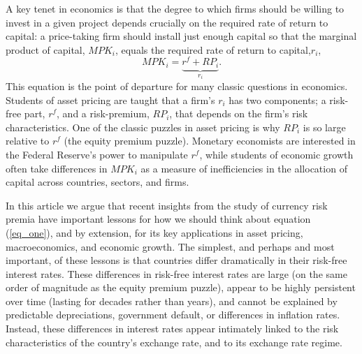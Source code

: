 \documentclass[12pt,letter]{article}
\theoremstyle{break} \theorembodyfont{\normalfont\itshape}
\theoremstyle{break}
\theoremstyle{break} \theorembodyfont{\normalfont\itshape}
\theoremstyle{break} \theorembodyfont{\normalfont\itshape}
\begin{document}
A key tenet in economics is that the degree to which firms should be
willing to invest in a given project depends crucially on the required
rate of return to capital: a price-taking firm should install just
enough capital so that the marginal product of capital, $MPK_i$,
equals the required rate of return to capital,$r_i$,
\begin{equation}
  MPK_i=\underbrace{r^f+RP_i}_{r_i}.
  \label{eq_one}
\end{equation} 
This equation is the point of departure for many classic questions in
economics. Students of asset pricing are taught that a firm's $r_i$
has two components; a risk-free part, $r^f$, and a risk-premium,
$RP_i$, that depends on the firm's risk characteristics. One of the
classic puzzles in asset pricing is why $RP_i$ is so large relative to
$r^f$ (the equity premium puzzle). Monetary economists are interested
in the Federal Reserve's power to manipulate $r^f$, while students of
economic growth often take differences in $MPK_i$ as a measure of
inefficiencies in the allocation of capital across countries, sectors,
and firms.

In this article we argue that recent insights from the study of
currency risk premia have important lessons for how we should think
about equation (\ref{eq_one}), and by extension, for its key
applications in asset pricing, macroeconomics, and economic growth.
The simplest, and perhaps and most important, of these lessons is that
countries differ dramatically in their risk-free interest rates. These
differences in risk-free interest rates are large (on the same order
of magnitude as the equity premium puzzle), appear to be highly
persistent over time (lasting for decades rather than years), and
cannot be explained by predictable depreciations, government default,
or differences in inflation rates. Instead, these differences in
interest rates appear intimately linked to the risk characteristics of
the country's exchange rate, and to its exchange rate regime.
\end{document}
